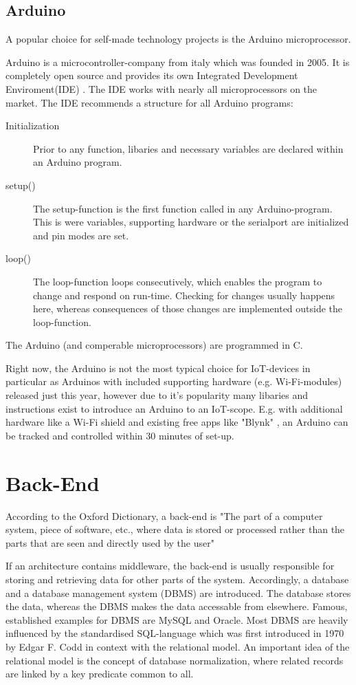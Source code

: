 \subsection{Arduino}
A popular choice for self-made technology projects is the Arduino microprocessor.

Arduino is a microcontroller-company from italy which was founded in 2005. 
It is completely open source and provides its own Integrated Development Enviroment(IDE) \parencite{arduinoIDEDownload}.
The IDE works with nearly all microprocessors on the market. 
The IDE recommends a structure for all Arduino programs:
\begin{description}
    \item [Initialization]
    Prior to any function, libaries and necessary variables are declared within an Arduino program.
    \item [setup()]
    The setup-function is the first function called in any Arduino-program. 
    This is were variables, supporting hardware or the serialport are initialized and pin modes are set. 
    \item [loop()]
    The loop-function loops consecutively, 
    which enables the program to change and respond on run-time.
    Checking for changes usually happens here, 
    whereas consequences of those changes are implemented outside the loop-function.    
\end{description}
The Arduino (and comperable microprocessors) are programmed in C.

Right now, the Arduino is not the most typical choice for IoT-devices in particular as Arduinos 
with included supporting hardware (e.g. Wi-Fi-modules) released just this year,
however due to it's popularity many libaries and instructions exist to introduce an Arduino to an IoT-scope.
E.g. with additional hardware like a Wi-Fi shield and existing free apps like "Blynk"  \parencite{blynk}, 
an Arduino can be tracked and controlled within 30 minutes of set-up.


\section{Back-End}
According to the Oxford Dictionary, a back-end is 
"The part of a computer system, piece of software, etc., where data is stored or processed rather 
than the parts that are seen and directly used by the user" \parencite{backendDef}

If an architecture contains middleware, the back-end is usually responsible for storing and retrieving data for other parts of the system.
Accordingly, a database and a database management system (DBMS) are introduced.
The database stores the data, whereas the DBMS makes the data accessable from elsewhere.
Famous, established examples for DBMS are MySQL and Oracle.
Most DBMS are heavily influenced by the standardised SQL-language which was first introduced in 1970 by Edgar F. Codd in context with the relational model.
An important idea of the relational model is the concept of database normalization, where related records are linked by a key predicate common to all.

